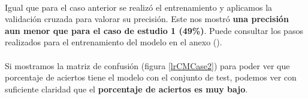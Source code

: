 \paragraph{}
Igual que para el caso anterior se realizó el entrenamiento y aplicamos la validación cruzada para valorar su precisión. Este nos mostró \textbf{una precisión aun menor que para el caso de estudio 1 (49\%)}. Puede consultar los pasos realizados para el entrenamiento del modelo en el anexo ().

\paragraph{}
Si mostramos la matriz de confusión\cite{ref:confusion_matrix} (figura \ref{lrCMCase2}) para poder ver que porcentaje de aciertos tiene el modelo con el conjunto de test, podemos ver con suficiente claridad que el \textbf{porcentaje de aciertos es muy bajo}.

